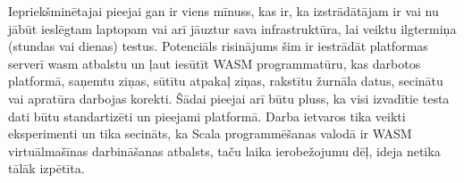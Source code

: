 Iepriekšminētajai pieejai gan ir viens mīnuss, kas ir, ka izstrādātājam ir vai
nu jābūt ieslēgtam laptopam vai arī jāuztur sava infrastruktūra, lai veiktu
ilgtermiņa (stundas vai dienas) testus. Potenciāls risinājums šim ir iestrādāt
platformas serverī \gls{wasm} atbalstu un ļaut iesūtīt WASM programmatūru, kas
darbotos platformā, saņemtu ziņas, sūtītu atpakaļ ziņas, rakstītu žurnāla datus,
secinātu vai apratūra darbojas korekti. Šādai pieejai arī būtu pluss, ka visi
izvadītie testa dati būtu standartizēti un pieejami platformā. Darba ietvaros
tika veikti eksperimenti un tika secināts, ka Scala programmēšanas valodā ir
WASM virtuālmašīnas darbināšanas atbalsts, taču laika ierobežojumu dēļ, ideja
netika tālāk izpētīta.
